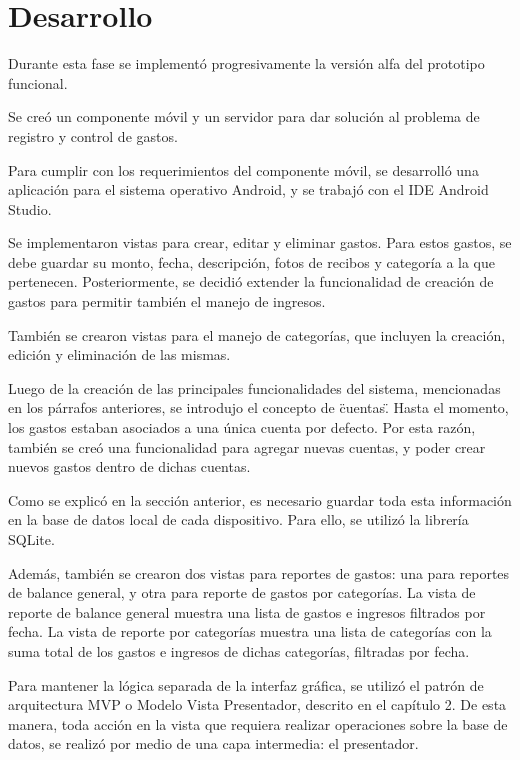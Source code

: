\section{Desarrollo} \label{sect:desarrollo}

Durante esta fase se implementó progresivamente la versión alfa del prototipo funcional. 

Se creó un componente móvil y un servidor para dar solución al problema de registro y control de gastos.

Para cumplir con los requerimientos del componente móvil, se desarrolló una aplicación para el sistema operativo Android, y se trabajó con el IDE Android Studio.

Se implementaron vistas para crear, editar y eliminar gastos. Para estos gastos, se debe guardar su monto, fecha, descripción, fotos de recibos y categoría a la que pertenecen. Posteriormente, se decidió extender la funcionalidad de creación de gastos para permitir también el manejo de ingresos. 

También se crearon vistas para el manejo de categorías, que incluyen la creación, edición y eliminación de las mismas.

Luego de la creación de las principales funcionalidades del sistema, mencionadas en los párrafos anteriores, se introdujo el concepto de \"cuentas\". Hasta el momento, los gastos estaban asociados a una única cuenta por defecto. Por esta razón, también se creó una funcionalidad para agregar nuevas cuentas, y poder crear nuevos gastos dentro de dichas cuentas.

Como se explicó en la sección anterior, es necesario guardar toda esta información en la base de datos local de cada dispositivo. Para ello, se utilizó la librería SQLite.

Además, también se crearon dos vistas para reportes de gastos: una para reportes de balance general, y otra para reporte de gastos por categorías.
La vista de reporte de balance general muestra una lista de gastos e ingresos filtrados por fecha. La vista de reporte por categorías muestra una lista de categorías con la suma total de los gastos e ingresos de dichas categorías, filtradas por fecha.

Para mantener la lógica separada de la interfaz gráfica, se utilizó el patrón de arquitectura MVP o Modelo Vista Presentador, descrito en el capítulo 2. De esta manera, toda acción en la vista que requiera realizar operaciones sobre la base de datos, se realizó por medio de una capa intermedia: el presentador. 


